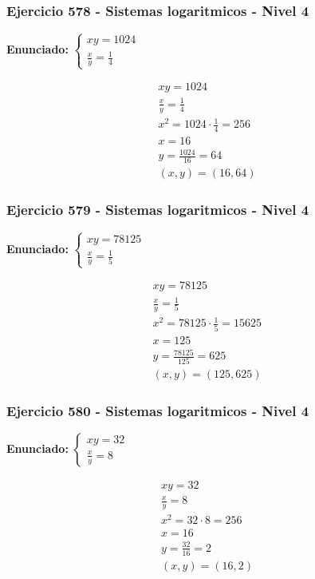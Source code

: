 \documentclass[12pt,a4paper]{article}
\begin{document}
\subsubsection*{Ejercicio 578 - Sistemas logaritmicos - Nivel 4}
\textbf{Enunciado:} \(\begin{cases} xy=1024\\ \frac{x}{y}=\frac{1}{4}\end{cases}\)

\[
\begin{aligned}
xy=1024\\
\frac{x}{y}=\frac{1}{4}\\
x^2=1024\cdot \frac{1}{4}=256\\
x=16\\
y=\frac{1024}{16}=64\\
\boxed{(x,y)=(16,64)}
\end{aligned}
\]


\subsubsection*{Ejercicio 579 - Sistemas logaritmicos - Nivel 4}
\textbf{Enunciado:} \(\begin{cases} xy=78125\\ \frac{x}{y}=\frac{1}{5}\end{cases}\)

\[
\begin{aligned}
xy=78125\\
\frac{x}{y}=\frac{1}{5}\\
x^2=78125\cdot \frac{1}{5}=15625\\
x=125\\
y=\frac{78125}{125}=625\\
\boxed{(x,y)=(125,625)}
\end{aligned}
\]


\subsubsection*{Ejercicio 580 - Sistemas logaritmicos - Nivel 4}
\textbf{Enunciado:} \(\begin{cases} xy=32\\ \frac{x}{y}=8\end{cases}\)

\[
\begin{aligned}
xy=32\\
\frac{x}{y}=8\\
x^2=32\cdot 8=256\\
x=16\\
y=\frac{32}{16}=2\\
\boxed{(x,y)=(16,2)}
\end{aligned}
\]
\end{document}
